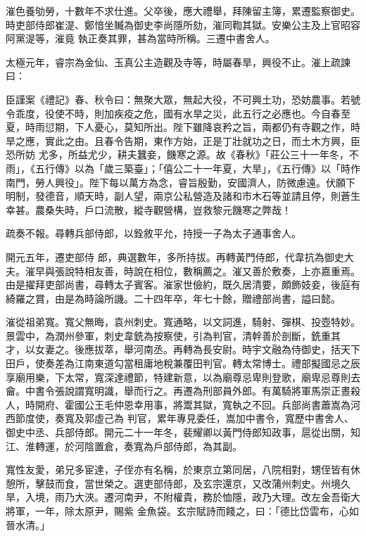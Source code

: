 \begin{pinyinscope}
 漼色養劬勞，十數年不求仕進。父卒後，應大禮舉，拜陳留主簿，累遷監察御史。時吏部侍郎崔湜、鄭愔坐贓為御史李尚隱所劾，漼同鞫其獄。安樂公主及上官昭容阿黨湜等，漼竟
 執正奏其罪，甚為當時所稱。三遷中書舍人。



 太極元年，睿宗為金仙、玉真公主造觀及寺等，時屬春旱，興役不止。漼上疏諫曰：



 臣謹案《禮記》春、秋令曰：無聚大眾，無起大役，不可興土功，恐妨農事。若號令乖度，役使不時，則加疾疫之危，國有水旱之災，此五行之必應也。今自春至夏，時雨愆期，下人憂心，莫知所出。陛下雖降哀矜之旨，兩都仍有寺觀之作，時旱之應，實此之由。且春令告期，東作方始，正是丁壯就功之日，而土木方興，臣恐所妨
 尤多，所益尤少，耕夫蠶妾，饑寒之源。故《春秋》「莊公三十一年冬，不雨」，《五行傳》以為「歲三築臺」；「僖公二十一年夏，大旱」，《五行傳》以「時作南門，勞人興役」。陛下每以萬方為念，睿旨殷勤，安國濟人，防微慮遠。伏願下明制，發德音，順天時，副人望，兩京公私營造及諸和市木石等並請且停，則蒼生幸甚。農桑失時，戶口流散，縱寺觀營構，豈救黎元饑寒之弊哉！



 疏奏不報。尋轉兵部侍郎，以銓敘平允，持授一子為太子通事舍人。



 開元五年，遷吏部侍
 郎，典選數年，多所持拔。再轉黃門侍郎，代韋抗為御史大夫。漼早與張說特相友善，時說在相位，數稱薦之。漼又善於敷奏，上亦嘉重焉。由是擢拜吏部尚書，尋轉太子賓客。漼家世儉約，既久居清要，頗飾妓妾，後庭有綺羅之賞，由是為時論所譏。二十四年卒，年七十餘，贈禮部尚書，謚曰懿。



 漼從祖弟寬。寬父無晦，袁州刺史。寬通略，以文詞進，騎射、彈棋、投壺特妙。景雲中，為潤州參軍，刺史韋銑為按察使，引為判官，清幹善於剖斷，銑重其
 才，以女妻之。後應拔萃，舉河南丞。再轉為長安尉。時宇文融為侍御史，括天下田戶，使奏差為江南東道勾當租庸地稅兼覆田判官。轉太常博士。禮部擬國忌之辰享廟用樂，下太常，寬深達禮節，特建新意，以為廟尊忌卑則登歌，廟卑忌尊則去龠。中書令張說謂寬明識，舉而行之。再遷為刑部員外郎。有萬騎將軍馬崇正晝殺人，時開府、霍國公王毛仲恩幸用事，將鬻其獄，寬執之不回。兵部尚書蕭嵩為河西節度使，奏寬及郭虛己為
 判官，累年專見委任，嵩加中書令，寬歷中書舍人、御史中丞、兵部侍郎。開元二十一年冬，裴耀卿以黃門侍郎知政事，扈從出關，知江、淮轉運，於河陰置倉，奏寬為戶部侍郎，為其副。



 寬性友愛，弟兄多宦達，子侄亦有名稱，於東京立第同居，八院相對，甥侄皆有休憩所，擊鼓而食，當世榮之。選吏部侍郎，及玄宗還京，又改蒲州刺史。州境久旱，入境，雨乃大浹。遷河南尹，不附權貴，務於恤隱，政乃大理。改左金吾衛大將軍，一年，除太原尹，賜紫
 金魚袋。玄宗賦詩而餞之，曰：「德比岱雲布，心如晉水清。」




\end{pinyinscope}

